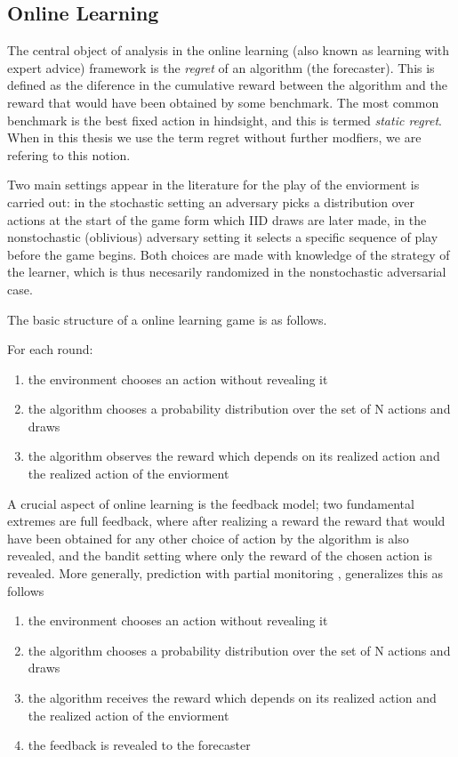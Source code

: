 \subsection{Online Learning}


The central object of analysis in the online learning (also known as learning with expert advice) framework is the \emph{regret} of an algorithm (the forecaster). This is defined as the diference in the cumulative reward between the algorithm and the reward that would have been obtained by some benchmark. 
The most common benchmark is the best fixed action in hindsight, and this is termed \emph{static regret}. 
When in this thesis we use the term regret without further modfiers, we are refering to this notion.

Two main settings appear in the literature for the play of the enviorment is carried out: in the stochastic setting an adversary picks a distribution over actions at the start of the game form which IID draws are later made, in the nonstochastic (oblivious) adversary setting it selects a specific sequence of play before the game begins. Both choices are made with knowledge of the strategy of the learner, which is thus necesarily randomized in the nonstochastic adversarial case.

The basic structure of a online learning game is as follows.

For each round:
\begin{enumerate}
\item the environment chooses an action without revealing it
\item the algorithm chooses a probability distribution over the set of N actions and draws
\item the algorithm observes the reward which depends on its realized action and the realized action of the enviorment
\end{enumerate}

A crucial aspect of online learning is the feedback model; two fundamental extremes are full feedback, where after realizing a reward the reward that would have been obtained for any other choice of action  by the algorithm is also revealed, and the bandit setting where only the reward of the chosen action is revealed. 
More generally, prediction with partial monitoring \cite{cesa2006regret}, generalizes this as follows


\begin{enumerate}
\item the environment chooses an action without revealing it
\item the algorithm chooses a probability distribution over the set of N actions and draws
\item the algorithm receives the reward which depends on its realized action and the realized action of the enviorment
\item the feedback is revealed to the forecaster
\end{enumerate}

